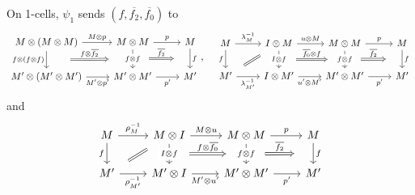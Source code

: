 \documentclass[a4paper,11pt,oneside,openany]{scrbook}
\begin{document}
\begin{exmp}
    On 1-cells, $\psi_1$ sends $(f,\overline{f_2},\overline{f_0})$ to
    \[\begin{tikzcd}
        {M\otimes (M\otimes M)} & {M\otimes M} & M \\
        {M'\otimes(M'\otimes M')} & {M'\otimes M'} & {M'}
        \arrow[""{name=0, anchor=center, inner sep=0}, "{f\otimes(f\otimes f)}"', from=1-1, to=2-1]
        \arrow[""{name=1, anchor=center, inner sep=0}, "f", from=1-3, to=2-3]
        \arrow[""{name=2, anchor=center, inner sep=0}, "{f\otimes f}"{description}, from=1-2, to=2-2]
        \arrow["p", from=1-2, to=1-3]
        \arrow["{p'}"', from=2-2, to=2-3]
        \arrow["{M'\otimes p'}"', from=2-1, to=2-2]
        \arrow["{M\otimes p}", from=1-1, to=1-2]
        \arrow["{\overline{f_2}}", shorten <=16pt, shorten >=16pt, Rightarrow, from=2, to=1]
        \arrow["{f\otimes\overline{f_2}}", shorten <=24pt, shorten >=24pt, Rightarrow, from=0, to=2]
    \end{tikzcd},\quad
        \begin{tikzcd}
        M & {I\otimes M} & {M\otimes M} & M \\
        {M'} & {I\otimes M'} & {M'\otimes M'} & {M'}
        \arrow[""{name=0, anchor=center, inner sep=0}, "f", from=1-4, to=2-4]
        \arrow[""{name=1, anchor=center, inner sep=0}, "{f\otimes f}"{description}, from=1-3, to=2-3]
        \arrow["p", from=1-3, to=1-4]
        \arrow["{p'}"', from=2-3, to=2-4]
        \arrow["{u'\otimes M'}"', from=2-2, to=2-3]
        \arrow["{u\otimes M}", from=1-2, to=1-3]
        \arrow[""{name=2, anchor=center, inner sep=0}, "{I\otimes f}"{description}, from=1-2, to=2-2]
        \arrow["{\lambda_{M'}^{-1}}"', from=2-1, to=2-2]
        \arrow["{\lambda_M^{-1}}", from=1-1, to=1-2]
        \arrow["f"', from=1-1, to=2-1]
        \arrow[shorten <=9pt, shorten >=9pt, Rightarrow, no head, from=2-1, to=1-2]
        \arrow["{\overline{f_2}}", shorten <=16pt, shorten >=16pt, Rightarrow, from=1, to=0]
        \arrow["{\overline{f_0}\otimes f}", shorten <=17pt, shorten >=17pt, Rightarrow, from=2, to=1]
    \end{tikzcd}\]
    and
    \[\begin{tikzcd}
        M & {M\otimes I} & {M\otimes M} & M \\
        {M'} & {M'\otimes I} & {M'\otimes M'} & {M'}
        \arrow[""{name=0, anchor=center, inner sep=0}, "f", from=1-4, to=2-4]
        \arrow["{p'}"', from=2-3, to=2-4]
        \arrow[shorten <=9pt, shorten >=9pt, Rightarrow, no head, from=2-1, to=1-2]
        \arrow["{\rho_M^{-1}}", from=1-1, to=1-2]
        \arrow["f"', from=1-1, to=2-1]
        \arrow["{M'\otimes u'}"', from=2-2, to=2-3]
        \arrow[""{name=1, anchor=center, inner sep=0}, "{I\otimes f}"{description}, from=1-2, to=2-2]
        \arrow["{\rho_{M'}^{-1}}"', from=2-1, to=2-2]
        \arrow[""{name=2, anchor=center, inner sep=0}, "{f\otimes f}"{description}, from=1-3, to=2-3]
        \arrow["p", from=1-3, to=1-4]
        \arrow["{M\otimes u}", from=1-2, to=1-3]
        \arrow["{\overline{f_2}}", shorten <=16pt, shorten >=16pt, Rightarrow, from=2, to=0]
        \arrow["{f\otimes\overline{f_0}}", shorten <=17pt, shorten >=17pt, Rightarrow, from=1, to=2]
    \end{tikzcd}\]


\end{exmp}
\end{document}
